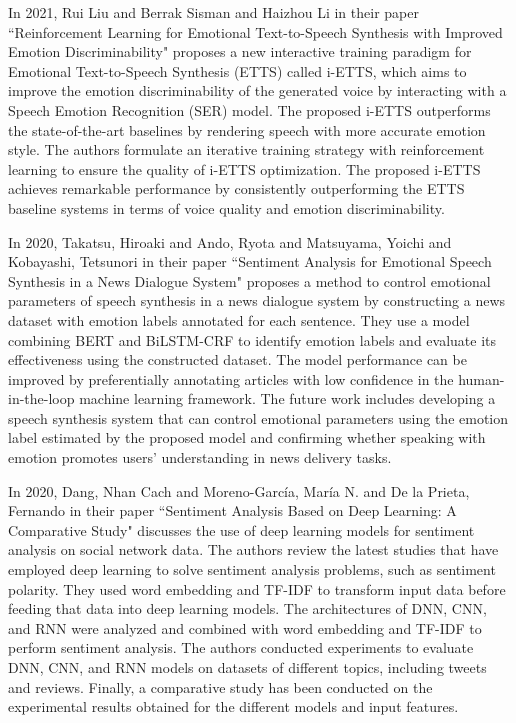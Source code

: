In 2021, Rui Liu and Berrak Sisman and Haizhou Li in their paper ``Reinforcement Learning for Emotional Text-to-Speech Synthesis with Improved Emotion Discriminability" proposes a new interactive training paradigm for Emotional Text-to-Speech Synthesis (ETTS) called i-ETTS, which aims to improve the emotion discriminability of the generated voice by interacting with a Speech Emotion Recognition (SER) model. The proposed i-ETTS outperforms the state-of-the-art baselines by rendering speech with more accurate emotion style. The authors formulate an iterative training strategy with reinforcement learning to ensure the quality of i-ETTS optimization. The proposed i-ETTS achieves remarkable performance by consistently outperforming the ETTS baseline systems in terms of voice quality and emotion discriminability\cite{liu21p_interspeech}.

In 2020, Takatsu, Hiroaki  and Ando, Ryota and Matsuyama, Yoichi  and Kobayashi, Tetsunori in their paper ``Sentiment Analysis for Emotional Speech Synthesis in a News Dialogue System" proposes a method to control emotional parameters of speech synthesis in a news dialogue system by constructing a news dataset with emotion labels annotated for each sentence. They use a model combining BERT and BiLSTM-CRF to identify emotion labels and evaluate its effectiveness using the constructed dataset. The model performance can be improved by preferentially annotating articles with low confidence in the human-in-the-loop machine learning framework. The future work includes developing a speech synthesis system that can control emotional parameters using the emotion label estimated by the proposed model and confirming whether speaking with emotion promotes users' understanding in news delivery tasks\cite{takatsu-etal-2020-sentiment}.

In 2020, Dang, Nhan Cach and Moreno-García, María N. and De la Prieta, Fernando in their paper ``Sentiment Analysis Based on Deep Learning: A Comparative Study" discusses the use of deep learning models for sentiment analysis on social network data. The authors review the latest studies that have employed deep learning to solve sentiment analysis problems, such as sentiment polarity. They used word embedding and TF-IDF to transform input data before feeding that data into deep learning models. The architectures of DNN, CNN, and RNN were analyzed and combined with word embedding and TF-IDF to perform sentiment analysis. The authors conducted experiments to evaluate DNN, CNN, and RNN models on datasets of different topics, including tweets and reviews. Finally, a comparative study has been conducted on the experimental results obtained for the different models and input features\cite{electronics9030483}.

